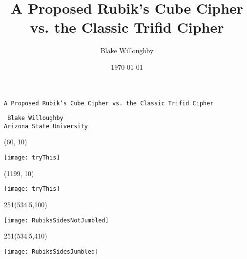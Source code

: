 \documentclass{beamer}%
\title{A Proposed Rubik's Cube Cipher vs. the Classic Trifid Cipher}
\author{Blake Willoughby}
\institute{Arizona State University}
\date{\today}
\begin{document}
	\begin{block}  
		{\centering \Huge \texttt{A Proposed Rubik's Cube Cipher vs. the Classic Trifid Cipher}}
		\begin{center}
			\Large\texttt{
			Blake Willoughby\\
				Arizona State University\\
				}
		\end{center}
	\end{block}  
	\begin{textblock}{20}(60, 10)
		\begin{center}
			\texttt{[image: tryThis]}
		\end{center}
	\end{textblock}	
\begin{textblock}{20}(1199, 10)
	\begin{center}
	\texttt{[image: tryThis]}
	\end{center}
\end{textblock}	
	\begin{textblock}{251}(534.5,100)
	\begin{center}
	\texttt{[image: RubiksSidesNotJumbled]}
	\end{center}
	\end{textblock}
	\begin{textblock}{251}(534.5,410)
	\begin{center}	
	\texttt{[image: RubiksSidesJumbled]}
	\end{center}
	\end{textblock}
	
\end{document}
